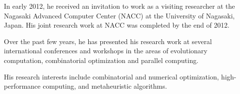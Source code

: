 In early 2012, he received an invitation to work as a visiting researcher
at the Nagasaki Advanced Computer Center (NACC) at the University
of Nagasaki, Japan. His joint research work at NACC was completed
by the end of 2012.

Over the past few years, he has presented his research work at several
international conferences and workshops in the areas of evolutionary
computation, combinatorial optimization and parallel computing.

His research interests include combinatorial and numerical optimization,
high-performance computing, and metaheuristic algorithms.
